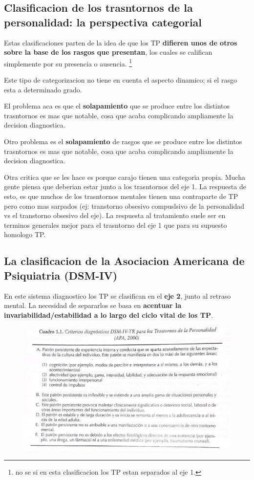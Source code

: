 \documentclass[12pt,a4paper]{article}
\begin{document}
\subsection{Clasificacion de los trasntornos de la personalidad: la perspectiva categorial}

Estas clasificaciones parten de la idea de que los TP \textbf{difieren unos de otros sobre la base de los rasgos que presentan}, los cuales se califican simplemente por su presencia o ausencia. \footnote{no se si en esta clasificacion los TP estan separados al eje 1.}

Este tipo de categorizacion no tiene en cuenta el aspecto dinamico; si el rasgo esta a determinado grado.

El problema aca es que el \textbf{solapamiento} que se produce entre los distintos trasntornos es mas que notable, cosa que acaba complicando ampliamente la decision diagnostica. 

Otro problema es el \textbf{solapamiento} de rasgos que se produce entre los distintos trasntornos es mas que notable, cosa que acaba complicando ampliamente la decision diagnostica. 

Otra critica que se les hace es porque carajo tienen una categoria propia. Mucha gente piensa que deberian estar junto a los trasntornos del eje 1. La respuesta de esto, es que muchos de los trasntornos mentales tienen una contraparte de TP pero como mas sarpados (ej: transtorno obsesivo compuslsivo de la personalidad vs el transtorno obsesivo del eje). La respuesta al tratamiento suele ser en terminos generales mejor para el trasntorno del eje 1 que para su supuesto homologo TP.

\subsection{La clasificacion de la Asociacion Americana de Psiquiatria (DSM-IV)}

En este sistema diagnostico los TP se clasifican en el \textbf{eje 2}, junto al retraso mental. La necesidad de separarlos se basa en \textbf{acentuar la invariabilidad/estabilidad a lo largo del ciclo vital de los TP}. 

\begin{figure}[!h]
	\centering
	\includegraphics[width=0.7\linewidth]{hola.png}
	\label{fig:hola}
\end{figure}
\end{document}
